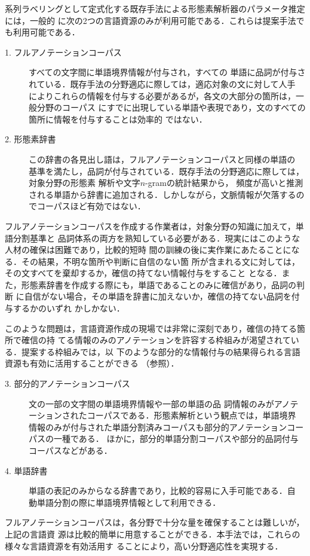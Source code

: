 \documentclass[japanese]{jnlp_1.4}
\def\figref#1{}
\begin{document}
系列ラベリングとして定式化する既存手法による形態素解析器のパラメータ推定には，一般的
に次の2つの言語資源のみが利用可能である．これらは提案手法でも利用可能である．
\begin{description}
\item[1. フルアノテーションコーパス] すべての文字間に単語境界情報が付与され，すべての
  単語に品詞が付与されている．既存手法の分野適応に際しては，適応対象の文に対して人手
  によりこれらの情報を付与する必要があるが，各文の大部分の箇所は，一般分野のコーパス
  にすでに出現している単語や表現であり，文のすべての箇所に情報を付与することは効率的
  ではない．

\item[2. 形態素辞書] この辞書の各見出し語は，フルアノテーションコーパスと同様の単語の
  基準を満たし，品詞が付与されている．既存手法の分野適応に際しては，対象分野の形態素
  解析や文字$n$-gramの統計結果\cite{nグラム統計によるコーパスからの未知語抽出}から，
  頻度が高いと推測される単語から辞書に追加される．しかしながら，文脈情報が欠落するの
  でコーパスほど有効ではない．

\end{description}
フルアノテーションコーパスを作成する作業者は，対象分野の知識に加えて，単語分割基準と
品詞体系の両方を熟知している必要がある．現実にはこのような人材の確保は困難であり，比較的短時
間の訓練の後に実作業にあたることになる．その結果，不明な箇所や判断に自信のない箇
所が含まれる文に対しては，その文すべてを棄却するか，確信の持てない情報付与をすること
となる．また，形態素辞書を作成する際にも，単語であることのみに確信があり，品詞の判断
に自信がない場合，その単語を辞書に加えないか，確信の持てない品詞を付与するかのいずれ
かしかない．

このような問題は，言語資源作成の現場では非常に深刻であり，確信の持てる箇所で確信の持
てる情報のみのアノテーションを許容する枠組みが渇望されている．提案する枠組みでは，以
下のような部分的な情報付与の結果得られる言語資源も有効に活用することができる
（\figref{figure:LR}参照）．

\begin{description}

\item[3. 部分的アノテーションコーパス] 文の一部の文字間の単語境界情報や一部の単語の品
  詞情報のみがアノテーションされたコーパスである．形態素解析という観点では，単語境界
  情報のみが付与された単語分割済みコーパスも部分的アノテーションコーパスの一種である．
  ほかに，部分的単語分割コーパスや部分的品詞付与コーパスなどがある．

 \item[4. 単語辞書] 単語の表記のみからなる辞書であり，比較的容易に入手可能である．自
   動単語分割の際に単語境界情報として利用できる．

\end{description}
フルアノテーションコーパスは，各分野で十分な量を確保することは難しいが，上記の言語資
源は比較的簡単に用意することができる．本手法では，これらの様々な言語資源を有効活用す
ることにより，高い分野適応性を実現する．
\end{document}

